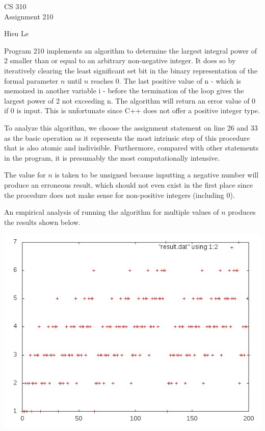 \documentclass[12pt]{article}
\begin{document}
\thispagestyle{empty}

\begin{center}
{\large CS 310}\\
Assignment 210
\end{center}

\begin{flushright}
Hieu Le
\end{flushright}

Program 210 implements an algorithm to determine the largest integral
power of 2 smaller than or equal to an arbitrary non-negative
integer. It does so by iteratively clearing the least significant set bit 
in the binary representation of the formal parameter $n$ until $n$ reaches 0. 
The last positive value of n - which is memoized in another variable i - 
before the termination of the loop gives the largest power of 2 not exceeding 
n. The algorithm will return an error value of 0 if 0 is input. This is 
unfortunate since C++ does not offer a positive integer type. 

To analyze this algorithm, we choose the assignment statement on line 26 and 33 as the basic operation as it represents the most intrinsic step of this procedure
that is also atomic and indivisible. Furthermore, compared with other statements 
in the program, it is presumably the most computationally intensive.

The value for $n$ is taken to be unsigned because inputting a negative number 
will produce an erroneous result, which should not even exist in the first
place since the procedure does not make sense for non-positive integers 
(including 0).

An empirical analysis of running the algorithm for multiple values of
$n$ produces the results shown below.

\begin{center}
\scalebox{.5} {\includegraphics{plot.jpeg}}
\end{center}
\end{document}
